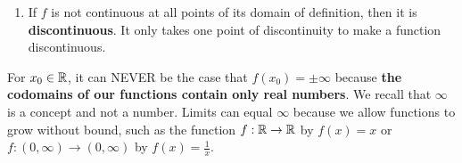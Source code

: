 \begin{tcolorbox}[colback=mylightblue, title = {\bf Continuity at a Point and Continuous Everywhere}, breakable]
\begin{definition}
\begin{enumerate}
      \item If $f$ is not continuous at all points of its domain of definition, then it is \textbf{discontinuous}. It only takes one point of discontinuity to make a function discontinuous. 
\end{enumerate}
\end{definition}

\begin{rem} For $x_0\in \mathbb R$, it can NEVER be the case that $f(x_0)=\pm \infty$ because \textbf{the codomains of our functions contain only real numbers}. We recall that $\infty$ is a concept and not a number. Limits can equal $\infty$ because we allow functions to grow without bound, such as the function $f:\mathbb R \to \mathbb R$ by $f(x)=x$ or $f:(0, \infty) \to (0, \infty)$ by $f(x) = \frac{1}{x}$. \\
  
\end{rem}

\end{tcolorbox}

\bigskip

 

\bigskip

